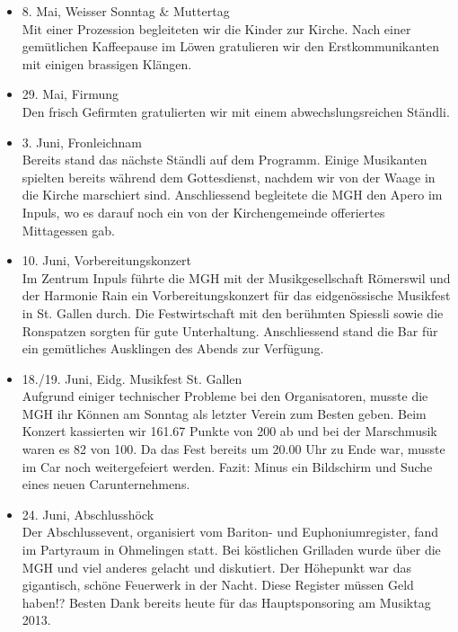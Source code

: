 \begin{history}
\begin{itemize}
        \item 8. Mai, Weisser Sonntag \& Muttertag\\
              Mit einer Prozession begleiteten wir die Kinder zur Kirche. Nach einer
              gemütlichen Kaffeepause im Löwen gratulieren wir den Erstkommunikanten
              mit einigen brassigen Klängen.

        \item 29. Mai, Firmung\\
              Den frisch Gefirmten gratulierten wir mit einem abwechslungsreichen
              Ständli.

        \item 3. Juni, Fronleichnam\\
              Bereits stand das nächste Ständli auf dem Programm. Einige Musikanten
              spielten bereits während dem Gottesdienst, nachdem wir von der Waage in
              die Kirche marschiert sind. Anschliessend begleitete die MGH den Apero
              im Inpuls, wo es darauf noch ein von der Kirchengemeinde offeriertes
              Mittagessen gab.

        \item 10. Juni, Vorbereitungskonzert\\
              Im Zentrum Inpuls führte die MGH mit der Musikgesellschaft Römerswil und
              der Harmonie Rain ein Vorbereitungskonzert für das eidgenössische
              Musikfest in St. Gallen durch. Die Festwirtschaft mit den berühmten
              Spiessli sowie die Ronspatzen sorgten für gute Unterhaltung.
              Anschliessend stand die Bar für ein gemütliches Ausklingen des Abends
              zur Verfügung.

        \item 18./19. Juni, Eidg. Musikfest St. Gallen\\
              Aufgrund einiger technischer Probleme bei den Organisatoren, musste die
              MGH ihr Können am Sonntag als letzter Verein zum Besten geben. Beim
              Konzert kassierten wir 161.67 Punkte von 200 ab und bei der Marschmusik
              waren es 82 von 100. Da das Fest bereits um 20.00 Uhr zu Ende war,
              musste im Car noch weitergefeiert werden. Fazit: Minus ein Bildschirm
              und Suche eines neuen Carunternehmens.

        \item 24. Juni, Abschlusshöck\\
              Der Abschlussevent, organisiert vom Bariton- und Euphoniumregister, fand
              im Partyraum in Ohmelingen statt. Bei köstlichen Grilladen wurde über
              die MGH und viel anderes gelacht und diskutiert. Der Höhepunkt war das
              gigantisch, schöne Feuerwerk in der Nacht. Diese Register müssen Geld
              haben!? Besten Dank bereits heute für das Hauptsponsoring am Musiktag
              2013.


\end{itemize}
\end{history}
